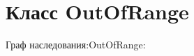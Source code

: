 \hypertarget{classOutOfRange}{}\section{Класс Out\+Of\+Range}
\label{classOutOfRange}


Граф наследования\+:Out\+Of\+Range\+:
